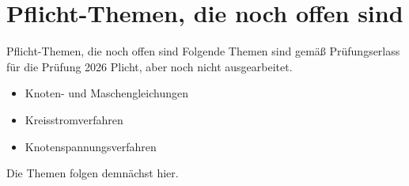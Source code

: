 \documentclass[aspectratio=169, ignorenonframetext]{beamer}
\begin{document}
\section{Pflicht-Themen, die noch offen sind}
\begin{frame}{Pflicht-Themen, die noch offen sind}
Folgende Themen sind gemäß Prüfungserlass für die Prüfung 2026 Plicht, aber noch nicht ausgearbeitet.
\begin{itemize}
    \item Knoten- und Maschengleichungen
    \item Kreisstromverfahren
    \item Knotenspannungsverfahren
\end{itemize}

Die Themen folgen demnächst hier.
\end{frame}





%
%
\end{document}

